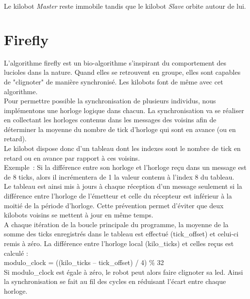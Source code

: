 \documentclass[a4paper,8pt]{report}
\begin{document}
Le kilobot \textit{Master} reste immobile tandis que le kilobot \textit{Slave} orbite autour de lui.\\

\section*{Firefly}\label{sec:name}

L'algorithme firefly est un bio-algorithme s'inspirant du comportement des lucioles dans la nature. Quand elles se retrouvent en groupe, elles sont capables de "clignoter" de manière synchronisé.
Les kilobots font de même avec cet algorithme.\\

Pour permettre possible la synchronisation de plusieurs individus, nous implémentons une horloge logique dans chacun. La synchronisation va se réaliser en collectant les horloges contenus dans les messages des voisins afin de déterminer la moyenne du nombre de tick d'horloge qui sont en avance (ou en retard).\\

Le kilobot dispose donc d'un tableau dont les indexes sont le nombre de tick en retard ou en avance par rapport à ces voisins.\\
Exemple : Si la différence entre son horloge et l'horloge reçu dans un message est de 8 ticks, alors il incrémentera de 1 la valeur contenu à l'index 8 du tableau.\\
Le tableau est ainsi mis à jours à chaque réception d'un message seulement si la différence entre l'horloge de l’émetteur et celle du récepteur est inférieur à la moitié de la période d'horloge. Cette prévention permet d'éviter que deux kilobots voisins se mettent à jour en même temps.\\

A chaque itération de la boucle principale du programme, la moyenne de la somme des ticks enregistrés dans le tableau est effectué (tick\_offset) et celui-ci remis à zéro. La différence entre l'horloge local (kilo\_ticks) et celles reçus est calculé :\\

modulo\_clock = ((kilo\_ticks – tick\_offset) / 4) \% 32\\

Si modulo\_clock est égale à zéro, le robot peut alors faire clignoter sa led. 
Ainsi la synchronisation se fait au fil des cycles en réduisant l'écart entre chaque horloge.
\end{document}
